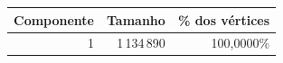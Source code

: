 \begin{tabular}{rrr}
    \toprule
    Componente & Tamanho & \% dos vértices \\
    \midrule
    1 & 1\,134\,890 & 100,0000\% \\
    \bottomrule
\end{tabular}
